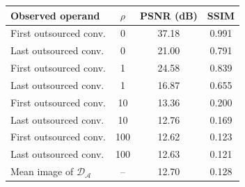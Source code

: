 \footnotesize
\begin{tabular}{@{}lccc@{}}
\toprule
Observed operand & $\rho$ & PSNR (dB) & SSIM \\
\midrule
First outsourced conv. & 0 & 37.18 & 0.991 \\
Last outsourced conv. & 0 & 21.00 & 0.791 \\
First outsourced conv. & 1 & 24.58 & 0.839 \\
Last outsourced conv. & 1 & 16.87 & 0.655 \\
First outsourced conv. & 10 & 13.36 & 0.200 \\
Last outsourced conv. & 10 & 12.76 & 0.169 \\
First outsourced conv. & 100 & 12.62 & 0.123 \\
Last outsourced conv. & 100 & 12.63 & 0.121 \\
\midrule
Mean image of $\mathcal{D}_{\mathcal{A}}$ & -- & 12.70 & 0.128 \\
\bottomrule
\end{tabular}